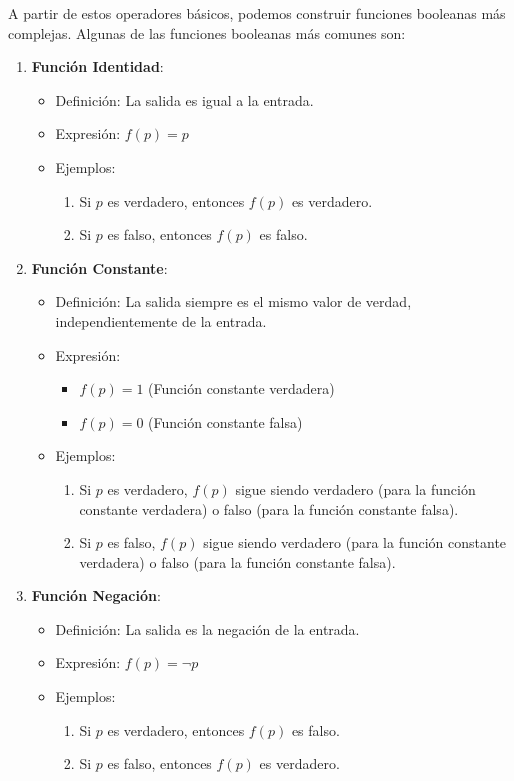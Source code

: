 A partir de estos operadores básicos, podemos construir funciones booleanas más complejas. Algunas de las funciones booleanas más comunes son:

\begin{enumerate}
	\item \textbf{Función Identidad}:
	\begin{itemize}
		\item Definición: La salida es igual a la entrada.
		\item Expresión: $f(p) = p$
		\item Ejemplos:
		\begin{enumerate}
			\item Si $p$ es verdadero, entonces $f(p)$ es verdadero.
			\item Si $p$ es falso, entonces $f(p)$ es falso.
		\end{enumerate}
	\end{itemize}
	
	\item \textbf{Función Constante}:
	\begin{itemize}
		\item Definición: La salida siempre es el mismo valor de verdad, independientemente de la entrada.
		\item Expresión:
		\begin{itemize}
			\item $f(p) = 1$ (Función constante verdadera)
			\item $f(p) = 0$ (Función constante falsa)
		\end{itemize}
		\item Ejemplos:
		\begin{enumerate}
			\item Si $p$ es verdadero, $f(p)$ sigue siendo verdadero (para la función constante verdadera) o falso (para la función constante falsa).
			\item Si $p$ es falso, $f(p)$ sigue siendo verdadero (para la función constante verdadera) o falso (para la función constante falsa).
		\end{enumerate}
	\end{itemize}
	
	\item \textbf{Función Negación}:
	\begin{itemize}
		\item Definición: La salida es la negación de la entrada.
		\item Expresión: \( f(p) = \neg p \)
		\item Ejemplos:
		\begin{enumerate}
			\item Si $p$ es verdadero, entonces $f(p)$ es falso.
			\item Si $p$ es falso, entonces $f(p)$ es verdadero.
		\end{enumerate}
	\end{itemize}
	

\end{enumerate}
